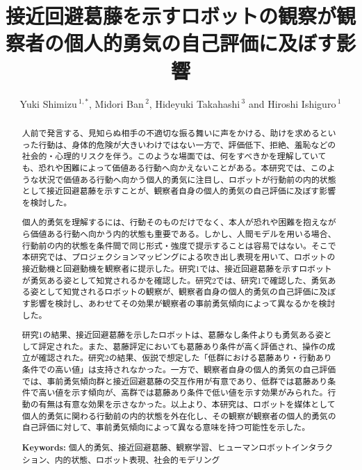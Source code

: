 \documentclass[utf8]{FrontiersinHarvard}
\def\firstAuthorLast{Shimizu {et~al.}}
\def\Authors{Yuki Shimizu\,$^{1,*}$, Midori Ban\,$^{2}$, Hideyuki Takahashi\,$^{3}$ and Hiroshi Ishiguro\,$^{1}$}
\begin{document}
\onecolumn
{}

\title[接近回避葛藤を示すロボット]{接近回避葛藤を示すロボットの観察が観察者の個人的勇気の自己評価に及ぼす影響}

\author[\firstAuthorLast ]{\Authors}
\address{}
\correspondance{}
\extraAuth{}

\maketitle

\begin{abstract}
人前で発言する、見知らぬ相手の不適切な振る舞いに声をかける、助けを求めるといった行動は、身体的危険が大きいわけではない一方で、評価低下、拒絶、羞恥などの社会的・心理的リスクを伴う。このような場面では、何をすべきかを理解していても、恐れや困難によって価値ある行動へ向かえないことがある。本研究では、このような状況で価値ある行動へ向かう個人的勇気に注目し、ロボットが行動前の内的状態として接近回避葛藤を示すことが、観察者自身の個人的勇気の自己評価に及ぼす影響を検討した。

個人的勇気を理解するには、行動そのものだけでなく、本人が恐れや困難を抱えながら価値ある行動へ向かう内的状態も重要である。しかし、人間モデルを用いる場合、行動前の内的状態を条件間で同じ形式・強度で提示することは容易ではない。そこで本研究では、プロジェクションマッピングによる吹き出し表現を用いて、ロボットの接近動機と回避動機を観察者に提示した。研究1では、接近回避葛藤を示すロボットが勇気ある姿として知覚されるかを確認した。研究2では、研究1で確認した、勇気ある姿として知覚されるロボットの観察が、観察者自身の個人的勇気の自己評価に及ぼす影響を検討し、あわせてその効果が観察者の事前勇気傾向によって異なるかを検討した。

研究1の結果、接近回避葛藤を示したロボットは、葛藤なし条件よりも勇気ある姿として評定された。また、葛藤評定においても葛藤あり条件が高く評価され、操作の成立が確認された。研究2の結果、仮説で想定した「低群における葛藤あり・行動あり条件での高い値」は支持されなかった。一方で、観察者自身の個人的勇気の自己評価では、事前勇気傾向群と接近回避葛藤の交互作用が有意であり、低群では葛藤あり条件で高い値を示す傾向が、高群では葛藤あり条件で低い値を示す効果がみられた。行動の有無は有意な効果を示さなかった。以上より、本研究は、ロボットを媒体として個人的勇気に関わる行動前の内的状態を外在化し、その観察が観察者の個人的勇気の自己評価に対して、事前勇気傾向によって異なる意味を持つ可能性を示した。

{\fontsize{8}{11}\selectfont\sloppy\noindent\textbf{Keywords:} 個人的勇気、接近回避葛藤、観察学習、ヒューマンロボットインタラクション、内的状態、ロボット表現、社会的モデリング\par}
\end{abstract}
\end{document}
